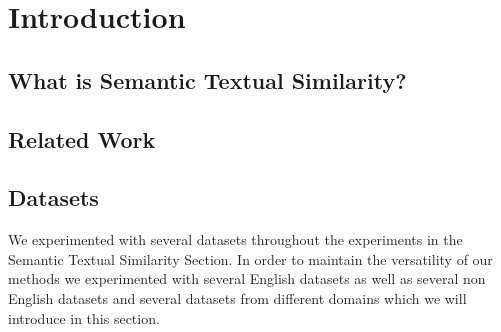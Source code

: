 \chapter{\label{cha:sts_introduction}Introduction}


\section{What is Semantic Textual Similarity?}
\cite{cer-etal-2017-semeval} 
\section{Related Work}

\section{Datasets}
We experimented with several datasets throughout the experiments in the Semantic Textual Similarity Section. In order to maintain the versatility of our methods we experimented with several English datasets as well as several non English datasets and several datasets from different domains which we will introduce in this section.


